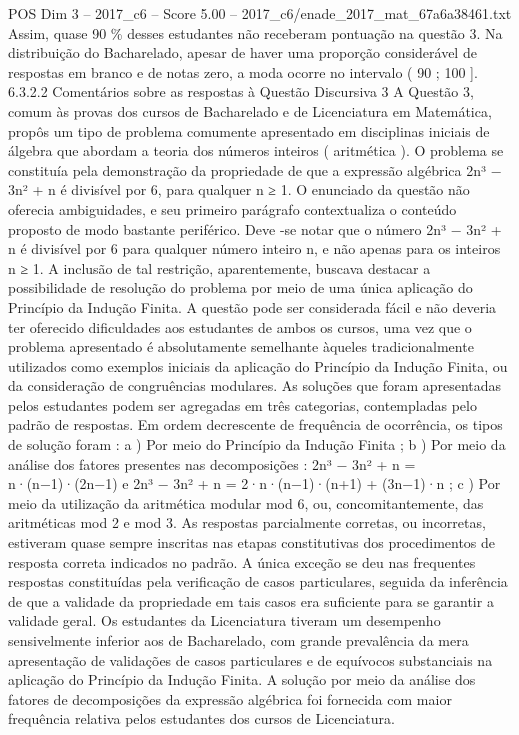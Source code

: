 \begin{textsample}{POS Dim 3 – 2017\_c6 – Score 5.00 – 2017\_c6/enade\_2017\_mat\_67a6a38461.txt}
Assim, quase 90 \% desses estudantes não receberam pontuação na questão 3.
Na distribuição do Bacharelado, apesar de haver uma proporção considerável de respostas em branco e de notas zero, a moda ocorre no intervalo ( 90 ; 100 ]. 6.3.2.2 Comentários sobre as respostas à Questão Discursiva 3 A Questão 3, comum às provas dos cursos de Bacharelado e de Licenciatura em Matemática, propôs um tipo de problema comumente apresentado em disciplinas iniciais de álgebra que abordam a teoria dos números inteiros ( aritmética ).
O problema se constituía pela demonstração da propriedade de que a expressão algébrica 2n³ − 3n² + n é divisível por 6, para qualquer n ≥ 1.
O enunciado da questão não oferecia ambiguidades, e seu primeiro parágrafo contextualiza o conteúdo proposto de modo bastante periférico.
Deve -se notar que o número 2n³ − 3n² + n é divisível por 6 para qualquer número inteiro n, e não apenas para os inteiros n ≥ 1.
A inclusão de tal restrição, aparentemente, buscava destacar a possibilidade de resolução do problema por meio de uma única aplicação do Princípio da Indução Finita.
A questão pode ser considerada fácil e não deveria ter oferecido dificuldades aos estudantes de ambos os cursos, uma vez que o problema apresentado é absolutamente semelhante àqueles tradicionalmente utilizados como exemplos iniciais da aplicação do Princípio da Indução Finita, ou da consideração de congruências modulares.
As soluções que foram apresentadas pelos estudantes podem ser agregadas em três categorias, contempladas pelo padrão de respostas.
Em ordem decrescente de frequência de ocorrência, os tipos de solução foram : a ) Por meio do Princípio da Indução Finita ; b ) Por meio da análise dos fatores presentes nas decomposições : 2n³ − 3n² + n = n·(n−1)·(2n−1) e 2n³ − 3n² + n = 2·n·(n−1)·(n+1) + (3n−1)·n ; c ) Por meio da utilização da aritmética modular mod 6, ou, concomitantemente, das aritméticas mod 2 e mod 3.
As respostas parcialmente corretas, ou incorretas, estiveram quase sempre inscritas nas etapas constitutivas dos procedimentos de resposta correta indicados no padrão.
A única exceção se deu nas frequentes respostas constituídas pela verificação de casos particulares, seguida da inferência de que a validade da propriedade em tais casos era suficiente para se garantir a validade geral.
Os estudantes da Licenciatura tiveram um desempenho sensivelmente inferior aos de Bacharelado, com grande prevalência da mera apresentação de validações de casos particulares e de equívocos substanciais na aplicação do Princípio da Indução Finita.
A solução por meio da análise dos fatores de decomposições da expressão algébrica foi fornecida com maior frequência relativa pelos estudantes dos cursos de Licenciatura.

\end{textsample}
